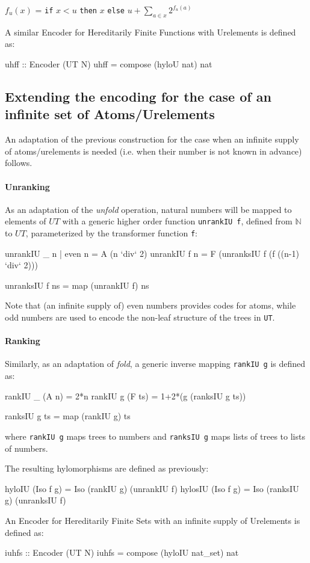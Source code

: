 \documentclass[]{INCLUDES/llncs}
\begin{document}
\vskip 0.30cm
$f_{u}(x)$ = 
{\tt if} $x<u$ 
{\tt then} $x$
{\tt else} $u+\sum_{a\in x}2^{f_{u}(a)}$ 
\vskip 0.30cm

A similar Encoder for Hereditarily Finite Functions with Urelements is defined
as:
\begin{code}
uhff :: Encoder (UT N)
uhff = compose (hyloU nat) nat
\end{code}

\subsection{Extending the encoding for the case of an infinite 
set of Atoms/Urelements} 

An adaptation of the previous construction for the case when an infinite supply
of atoms/urelements is needed (i.e. when their number is not known in  advance)
follows.

\paragraph*{Unranking} As an adaptation of the {\em unfold} 
operation, natural numbers will be mapped to elements of $UT$ with a generic 
higher order function {\tt unrankIU f}, defined from $\mathbb{N}$ to $UT$, 
parameterized by the transformer function {\tt f}:

\begin{code}
unrankIU _ n | even n = A (n `div` 2) 
unrankIU f n = F (unranksIU f (f  ((n-1) `div` 2)))

unranksIU f ns =  map (unrankIU f) ns
\end{code}
Note that (an infinite supply of) even numbers provides codes for atoms, while
odd numbers are used to encode the non-leaf structure of the trees in {\tt UT}.

\paragraph*{Ranking} Similarly, as an adaptation of {\em fold}, a generic
inverse mapping {\tt rankIU g} is defined as:
\begin{code}
rankIU _ (A n) = 2*n
rankIU g (F ts) = 1+2*(g (ranksIU g ts))

ranksIU g ts = map (rankIU g) ts
\end{code}
where {\tt rankIU g} maps trees to numbers and
{\tt ranksIU g} maps lists of trees to lists of numbers.

The resulting hylomorphisms are defined as previously:
\begin{code}
hyloIU (Iso f g) = Iso (rankIU g) (unrankIU f)
hylosIU (Iso f g) = Iso (ranksIU g) (unranksIU f)
\end{code}
An Encoder for Hereditarily Finite Sets with an infinite supply of Urelements is
defined as:
\begin{code}
iuhfs :: Encoder (UT N)
iuhfs = compose (hyloIU nat_set) nat
\end{code}
\end{document}
